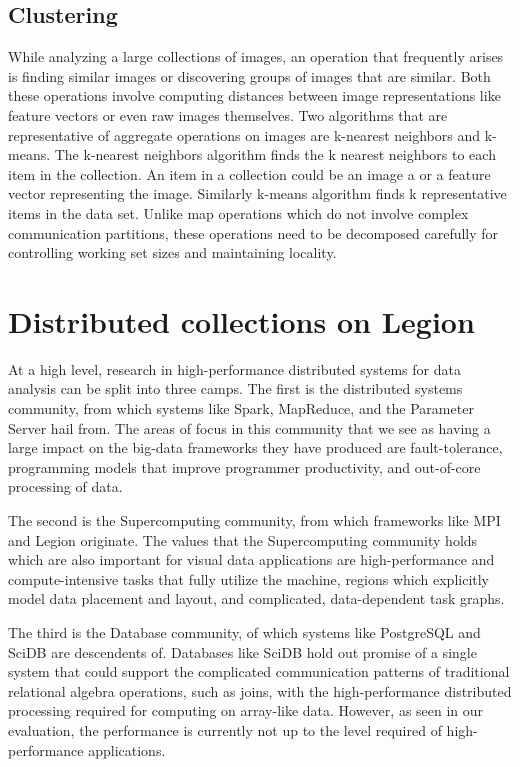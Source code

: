 \documentclass[tog]{acmsiggraph}
\begin{document}
\subsection{Clustering}

While analyzing a large collections of images, an operation that frequently
arises is finding similar images or discovering groups of images that are
similar. Both these operations involve computing distances between image
representations like feature vectors or even raw images themselves. Two
algorithms that are representative of aggregate operations on images are
k-nearest neighbors and k-means. The k-nearest neighbors algorithm finds the k
nearest neighbors to each item in the collection. An item in a collection could
be an image a or a feature vector representing the image. Similarly k-means
algorithm finds k representative items in the data set. Unlike map operations
which do not involve complex communication partitions, these operations need to
be decomposed carefully for controlling working set sizes and maintaining
locality.

\section{Distributed collections on Legion}

At a high level, research in high-performance distributed systems for data
analysis can be split into three camps. The first is the distributed systems
community, from which systems like Spark, MapReduce, and the Parameter Server
hail from. The areas of focus in this community that we see as having a large
impact on the big-data frameworks they have produced are fault-tolerance,
programming models that improve programmer productivity, and out-of-core
processing of data.

The second is the Supercomputing community, from which frameworks like MPI and
Legion \cite{bauer2012legion} originate. The values that the Supercomputing
community holds which are also important for visual data applications are
high-performance and compute-intensive tasks that fully utilize the machine,
regions which explicitly model data placement and layout, and complicated,
data-dependent task graphs.

The third is the Database community, of which systems like PostgreSQL and SciDB
are descendents of. Databases like SciDB hold out promise of a single system
that could support the complicated communication patterns of traditional
relational algebra operations, such as joins, with the high-performance
distributed processing required for computing on array-like data. However, as
seen in our evaluation, the performance is currently not up to the level
required of high-performance applications.
\end{document}
